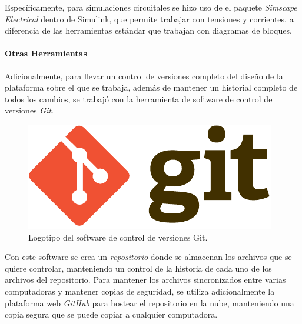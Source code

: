 Específicamente, para simulaciones circuitales se hizo uso de el paquete \textit{Simscape Electrical} dentro de Simulink, que permite trabajar con tensiones y corrientes, a diferencia de las herramientas estándar que trabajan con diagramas de bloques.\\

\paragraph{Otras Herramientas}

Adicionalmente, para llevar un control de versiones completo del diseño de la plataforma sobre el que se trabaja, además de mantener un historial completo de todos los cambios, se trabajó con la herramienta de software de control de versiones {\Medium\textit{Git}}.\\

\begin{figure}[h]
    \centering
    \includegraphics[scale=0.6]{Imagenes/Git.pdf}
    \caption{Logotipo del software de control de versiones Git.}
    \label{logo_git}
\end{figure}

Con este software se crea un \textit{repositorio} donde se almacenan los archivos que se quiere controlar, manteniendo un control de la historia de cada uno de los archivos del repositorio. Para mantener los archivos sincronizados entre varias computadoras y mantener copias de seguridad, se utiliza adicionalmente la plataforma web {\Medium\textit{GitHub}} para hostear el repositorio en la nube, manteniendo una copia segura que se puede copiar a cualquier computadora.\\